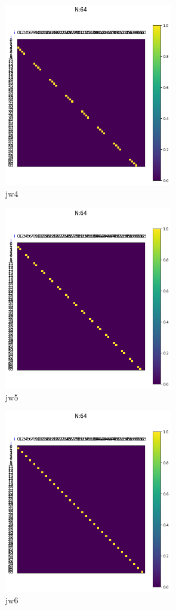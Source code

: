 \documentclass[a4paper, 10pt, dvipdfmx]{jlreq}
\begin{document}
\begin{figure}[htbp]
    \begin{center}
        \includegraphics[height=80mm]{jw_operators/4.png}
        \caption{jw4}
    \end{center}
\end{figure}
\begin{figure}[htbp]
    \begin{center}
        \includegraphics[height=80mm]{jw_operators/5.png}
        \caption{jw5}
    \end{center}
\end{figure}
\begin{figure}[htbp]
    \begin{center}
        \includegraphics[height=80mm]{jw_operators/6.png}
        \caption{jw6}
    \end{center}
\end{figure}
\end{document}
